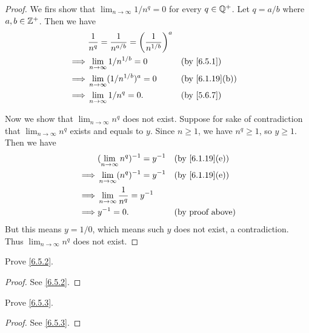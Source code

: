 \begin{proof}
  We firs show that \(\lim_{n \to \infty} 1 / n^q = 0\) for every \(q \in \mathbb{Q}^+\).
  Let \(q = a / b\) where \(a, b \in \mathbb{Z}^+\).
  Then we have
  \begin{align*}
             & \dfrac{1}{n^q} = \dfrac{1}{n^{a / b}} = \bigg(\dfrac{1}{n^{1 / b}}\bigg)^a                                   \\
    \implies & \lim_{n \to \infty} 1 / n^{1 / b} = 0                                      &  & \text{(by \cref{6.5.1})}     \\
    \implies & \lim_{n \to \infty} (1 / n^{1 / b})^a = 0                                  &  & \text{(by \cref{6.1.19}(b))} \\
    \implies & \lim_{n \to \infty} 1 / n^q = 0.                                           &  & \text{(by \cref{5.6.7})}
  \end{align*}

  Now we show that \(\lim_{n \to \infty} n^q\) does not exist.
  Suppose for sake of contradiction that \(\lim_{n \to \infty} n^q\) exists and equals to \(y\).
  Since \(n \geq 1\), we have \(n^q \geq 1\), so \(y \geq 1\).
  Then we have
  \begin{align*}
             & (\lim_{n \to \infty} n^q)^{-1} = y^{-1}     &  & \text{(by \cref{6.1.19}(e))} \\
    \implies & \lim_{n \to \infty} (n^q)^{-1} = y^{-1}     &  & \text{(by \cref{6.1.19}(e))} \\
    \implies & \lim_{n \to \infty} \dfrac{1}{n^q} = y^{-1}                                   \\
    \implies & y^{-1} = 0.                                 &  & \text{(by proof above)}
  \end{align*}
  But this means \(y = 1 / 0\), which means such \(y\) does not exist, a contradiction.
  Thus \(\lim_{n \to \infty} n^q\) does not exist.
\end{proof}

\begin{ex}\label{ex:6.5.2}
  Prove \cref{6.5.2}.
\end{ex}

\begin{proof}
  See \cref{6.5.2}.
\end{proof}

\begin{ex}\label{ex:6.5.3}
  Prove \cref{6.5.3}.
\end{ex}

\begin{proof}
  See \cref{6.5.3}.
\end{proof}